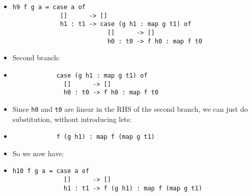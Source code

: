 \documentclass{beamer}
\begin{document}
\begin{frame}[fragile]

    \begin{itemize}[<+->]
        \item[]
            \begin{verbatim}
h9 f g a = case a of
             []      -> []
             h1 : t1 -> case (g h1 : map g t1) of
                          []      -> []
                          h0 : t0 -> f h0 : map f t0
            \end{verbatim}

        \item[] Second branch:

        \item[]
            \begin{verbatim}
            case (g h1 : map g t1) of
              []      -> []
              h0 : t0 -> f h0 : map f t0
            \end{verbatim}

        \item[] Since \texttt{h0} and \texttt{t0} are linear in the RHS of
            the second branch, we can just do substitution, without introducing
            lets:

        \item[]
            \begin{verbatim}
            f (g h1) : map f (map g t1)
            \end{verbatim}

        \item[] So we now have:

        \item[]
            \begin{verbatim}
h10 f g a = case a of
              []      -> []
              h1 : t1 -> f (g h1) : map f (map g t1)
            \end{verbatim}

    \end{itemize}

\end{frame}
\end{document}
